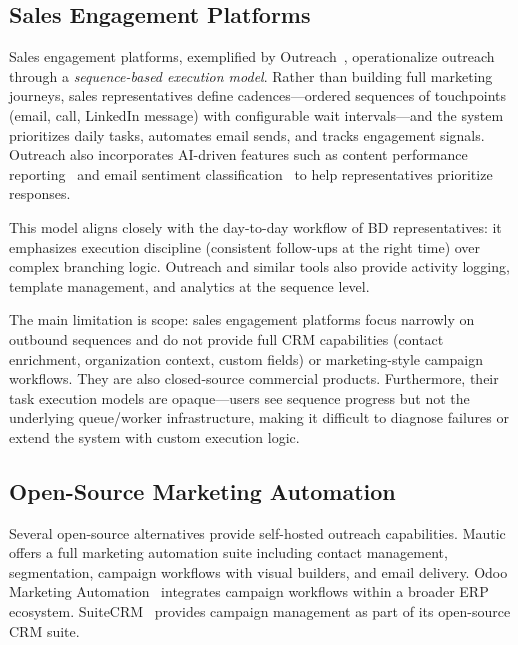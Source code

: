 \subsection{Sales Engagement Platforms}

Sales engagement platforms, exemplified by Outreach~\cite{outreach_sales_engagement}, operationalize outreach through a \emph{sequence-based execution model}. Rather than building full marketing journeys, sales representatives define cadences---ordered sequences of touchpoints (email, call, LinkedIn message) with configurable wait intervals---and the system prioritizes daily tasks, automates email sends, and tracks engagement signals. Outreach also incorporates AI-driven features such as content performance reporting~\cite{outreach_ai_content_reporting} and email sentiment classification~\cite{outreach_sentiment_classification} to help representatives prioritize responses.

This model aligns closely with the day-to-day workflow of BD representatives: it emphasizes execution discipline (consistent follow-ups at the right time) over complex branching logic. Outreach and similar tools also provide activity logging, template management, and analytics at the sequence level.

The main limitation is scope: sales engagement platforms focus narrowly on outbound sequences and do not provide full CRM capabilities (contact enrichment, organization context, custom fields) or marketing-style campaign workflows. They are also closed-source commercial products. Furthermore, their task execution models are opaque---users see sequence progress but not the underlying queue/worker infrastructure, making it difficult to diagnose failures or extend the system with custom execution logic.

\subsection{Open-Source Marketing Automation}

Several open-source alternatives provide self-hosted outreach capabilities. Mautic~\cite{mautic_docs} offers a full marketing automation suite including contact management, segmentation, campaign workflows with visual builders, and email delivery. Odoo Marketing Automation~\cite{odoo_marketing_automation} integrates campaign workflows within a broader ERP ecosystem. SuiteCRM~\cite{suitecrm_campaigns} provides campaign management as part of its open-source CRM suite.

